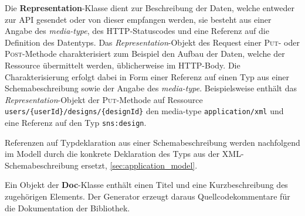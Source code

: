 Die \textbf{Representation}-Klasse dient zur Beschreibung der Daten, welche entweder zur \gls{API} gesendet oder von dieser empfangen werden, sie besteht aus einer Angabe des \emph{media-type}, des \gls{HTTP}-Statuscodes und eine Referenz auf die Definition des Datentyps. Das \emph{Representation}-Objekt des Request einer \textsc{Put}- oder \textsc{Post}-Methode charakterisiert zum Beispiel den Aufbau der Daten, welche der Ressource übermittelt werden, üblicherweise im \gls{HTTP}-Body. Die Charakterisierung erfolgt dabei in Form einer Referenz auf einen Typ aus einer Schemabeschreibung sowie der Angabe des \emph{media-type}. Beispielsweise enthält das \emph{Representation}-Objekt der \textsc{Put}-Methode auf Ressource \texttt{users/\{userId\}/designs/\{designId\}} den media-type \texttt{application/xml} und eine Referenz auf den Typ \texttt{sns:design}. 

Referenzen auf Typdeklaration aus einer Schemabeschreibung werden nachfolgend im Modell durch die konkrete Deklaration des Typs aus der \gls{XML}-Schemabeschreibung ersetzt, \cref{sec:application_model}. 

Ein Objekt der \textbf{Doc}-Klasse enthält einen Titel und eine Kurzbeschreibung des zugehörigen Elements.
Der Generator erzeugt daraus Quellcodekommentare für die Dokumentation der Bibliothek.